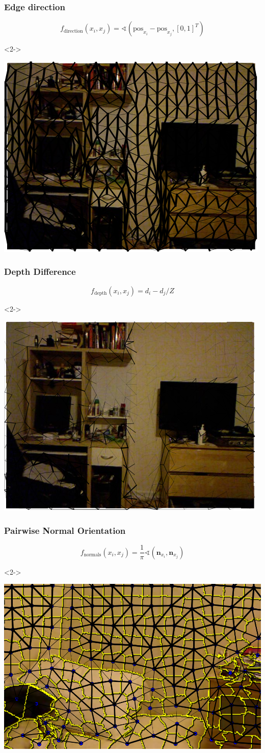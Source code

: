 \documentclass[final,ignorenonframetext,compress]{beamer}
\begin{document}
    \begin{frame}
        \frametitle{Edge direction}
        \[
            f_\text{direction}(x_i, x_j) = \sphericalangle(\text{pos}_{x_i} - \text{pos}_{x_j}, [0, 1]^T)
         \]
        \begin{visibleenv}<2->
        \begin{center}
            \includegraphics[width=.4\linewidth]{images/00062_pipline_feature_pairwise_4}
        \end{center}
        \end{visibleenv}
    \end{frame}

    \begin{frame}
        \frametitle{Depth Difference}
        \[
            f_\text{depth}(x_i, x_j) = d_i - d_j / Z
         \]
        \begin{visibleenv}<2->
        \begin{center}
            \includegraphics[width=.4\linewidth]{images/00062_pipline_feature_pairwise_2}
        \end{center}
        \end{visibleenv}
    \end{frame}
    

    \begin{frame}
        \frametitle{Pairwise Normal Orientation}
        \[
            f_\text{normals}(x_i, x_j) = \frac{1}{\pi}\sphericalangle(\mathbf{n}_{x_i}, \mathbf{n}_{x_j})
         \]
        \begin{visibleenv}<2->
        \begin{center}
            \includegraphics[width=.6\linewidth]{images/normal_feature}
        \end{center}
        \end{visibleenv}
    \end{frame}
\end{document}
